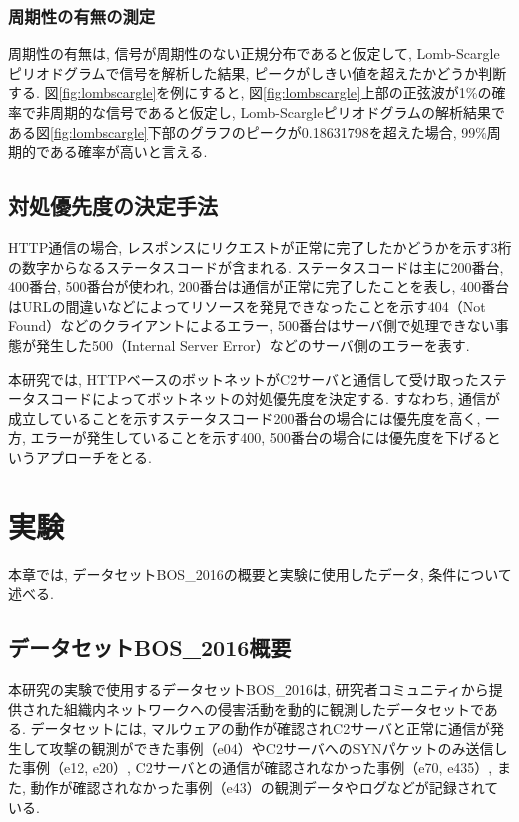 \documentclass[twocolumn,9pt]{ltjsarticle}
\begin{document}
\subsubsection{周期性の有無の測定}
周期性の有無は, 信号が周期性のない正規分布であると仮定して, Lomb-Scargleピリオドグラムで信号を解析した結果, ピークがしきい値を超えたかどうか判断する. 図\ref{fig:lombscargle}を例にすると, 図\ref{fig:lombscargle}上部の正弦波が1\%の確率で非周期的な信号であると仮定し, Lomb-Scargleピリオドグラムの解析結果である図\ref{fig:lombscargle}下部のグラフのピークが0.18631798を超えた場合, 99\%周期的である確率が高いと言える. 

\subsection{対処優先度の決定手法}
HTTP通信の場合, レスポンスにリクエストが正常に完了したかどうかを示す3桁の数字からなるステータスコードが含まれる. ステータスコードは主に200番台, 400番台, 500番台が使われ, 200番台は通信が正常に完了したことを表し, 400番台はURLの間違いなどによってリソースを発見できなったことを示す404（Not Found）などのクライアントによるエラー, 500番台はサーバ側で処理できない事態が発生した500（Internal Server Error）などのサーバ側のエラーを表す. 

本研究では, HTTPベースのボットネットがC2サーバと通信して受け取ったステータスコードによってボットネットの対処優先度を決定する. すなわち, 通信が成立していることを示すステータスコード200番台の場合には優先度を高く, 一方, エラーが発生していることを示す400, 500番台の場合には優先度を下げるというアプローチをとる. 

\section{実験}
本章では, データセットBOS\_2016の概要と実験に使用したデータ, 条件について述べる. 

\subsection{データセットBOS\_2016概要}
本研究の実験で使用するデータセットBOS\_2016は, 研究者コミュニティから提供された組織内ネットワークへの侵害活動を動的に観測したデータセットである. データセットには, マルウェアの動作が確認されC2サーバと正常に通信が発生して攻撃の観測ができた事例（e04）やC2サーバへのSYNパケットのみ送信した事例（e12, e20）, C2サーバとの通信が確認されなかった事例（e70, e435）, また, 動作が確認されなかった事例（e43）の観測データやログなどが記録されている. 
\end{document}
